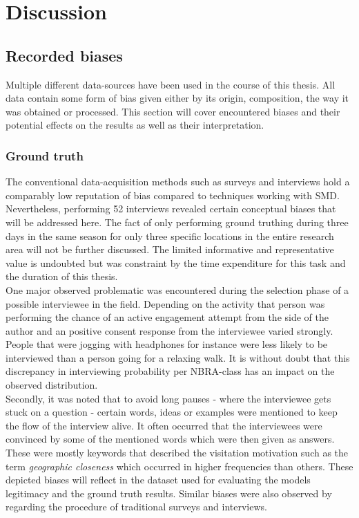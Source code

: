 \chapter{Discussion} \label{discussion}

\section{Recorded biases} \label{discussion_rec_bias}
Multiple different data-sources have been used in the course of this thesis. All data contain some form of bias given either by its origin, composition, the way it was obtained or processed. 
This section will cover encountered biases and their potential effects on the results as well as their interpretation.

\subsection*{Ground truth}
The conventional data-acquisition methods such as surveys and interviews hold a comparably low reputation of bias compared to techniques working with SMD. Nevertheless, performing 52 interviews revealed certain conceptual biases that will be addressed here. The fact of only performing ground truthing during three days in the same season for only three specific locations in the entire research area will not be further discussed. The limited informative and representative value is undoubted but was constraint by the time expenditure for this task and the duration of this thesis. \\
One major observed problematic was encountered during the selection phase of a possible interviewee in the field. Depending on the activity that person was performing the chance of an active engagement attempt from the side of the author and an positive consent response from the interviewee varied strongly. People that were jogging with headphones for instance were less likely to be interviewed than a person going for a relaxing walk. It is without doubt that this discrepancy in interviewing probability per NBRA-class has an impact on the observed distribution.\\
Secondly, it was noted that to avoid long pauses - where the interviewee gets stuck on a question - certain words, ideas or examples were mentioned to keep the flow of the interview alive. It often occurred that the interviewees were convinced by some of the mentioned words which were then given as answers. These were mostly keywords that described the visitation motivation such as the term \textit{geographic closeness} which occurred in higher frequencies than others. These depicted biases will reflect in the dataset used for evaluating the models legitimacy and the ground truth results. Similar biases were also observed by \parencite{Hanemann2011, Kling2012, Tenerelli2016} regarding the procedure of traditional surveys and interviews.

